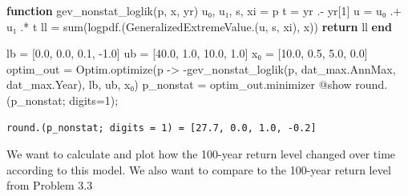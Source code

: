 \documentclass[
  letterpaper,
  DIV=11,
  numbers=noendperiod]{scrartcl}
\newenvironment{Shaded}{\begin{snugshade}}{\end{snugshade}}
\newcommand{\ControlFlowTok}[1]{\textcolor[rgb]{0.00,0.23,0.31}{\textbf{#1}}}
\newcommand{\FloatTok}[1]{\textcolor[rgb]{0.68,0.00,0.00}{#1}}
\newcommand{\FunctionTok}[1]{\textcolor[rgb]{0.28,0.35,0.67}{#1}}
\newcommand{\KeywordTok}[1]{\textcolor[rgb]{0.00,0.23,0.31}{\textbf{#1}}}
\newcommand{\NormalTok}[1]{\textcolor[rgb]{0.00,0.23,0.31}{#1}}
\newcommand{\OperatorTok}[1]{\textcolor[rgb]{0.37,0.37,0.37}{#1}}
\newcommand{\PreprocessorTok}[1]{\textcolor[rgb]{0.68,0.00,0.00}{#1}}
\begin{document}
\begin{Shaded}
\begin{Highlighting}[]
\KeywordTok{function} \FunctionTok{gev\_nonstat\_loglik}\NormalTok{(p, x, yr) }
\NormalTok{    u₀, u₁, s, xi }\OperatorTok{=}\NormalTok{ p}
\NormalTok{    t }\OperatorTok{=}\NormalTok{ yr }\OperatorTok{.{-}}\NormalTok{ yr[}\FloatTok{1}\NormalTok{]}
\NormalTok{    u }\OperatorTok{=}\NormalTok{ u₀ }\OperatorTok{.+}\NormalTok{ u₁ }\OperatorTok{.*}\NormalTok{ t}
\NormalTok{    ll }\OperatorTok{=} \FunctionTok{sum}\NormalTok{(}\FunctionTok{logpdf}\NormalTok{.(}\FunctionTok{GeneralizedExtremeValue}\NormalTok{.(u, s, xi), x))}
    \ControlFlowTok{return}\NormalTok{ ll}
\KeywordTok{end}

\NormalTok{lb }\OperatorTok{=}\NormalTok{ [}\FloatTok{0.0}\NormalTok{, }\FloatTok{0.0}\NormalTok{, }\FloatTok{0.1}\NormalTok{, }\OperatorTok{{-}}\FloatTok{1.0}\NormalTok{]}
\NormalTok{ub }\OperatorTok{=}\NormalTok{ [}\FloatTok{40.0}\NormalTok{, }\FloatTok{1.0}\NormalTok{, }\FloatTok{10.0}\NormalTok{, }\FloatTok{1.0}\NormalTok{]}
\NormalTok{x₀ }\OperatorTok{=}\NormalTok{ [}\FloatTok{10.0}\NormalTok{, }\FloatTok{0.5}\NormalTok{, }\FloatTok{5.0}\NormalTok{, }\FloatTok{0.0}\NormalTok{]}
\NormalTok{optim\_out }\OperatorTok{=}\NormalTok{ Optim.}\FunctionTok{optimize}\NormalTok{(p }\OperatorTok{{-}\textgreater{}} \FunctionTok{{-}gev\_nonstat\_loglik}\NormalTok{(p, dat\_max.AnnMax, dat\_max.Year), lb, ub, x₀)}
\NormalTok{p\_nonstat }\OperatorTok{=}\NormalTok{ optim\_out.minimizer}
\PreprocessorTok{@show} \FunctionTok{round}\NormalTok{.(p\_nonstat; digits}\OperatorTok{=}\FloatTok{1}\NormalTok{);}
\end{Highlighting}
\end{Shaded}

\begin{verbatim}
round.(p_nonstat; digits = 1) = [27.7, 0.0, 1.0, -0.2]
\end{verbatim}

We want to calculate and plot how the 100-year return level changed over
time according to this model. We also want to compare to the 100-year
return level from Problem 3.3
\end{document}
